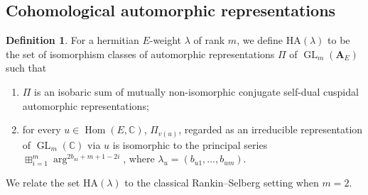 \documentclass[12pt]{amsart}
\numberwithin{equation}{section}
\theoremstyle{plain}
\theoremstyle{definition}
\newtheorem{definition}[proposition]{Definition}
\theoremstyle{remark}
\renewcommand{\b}[1]{\mathbf{#1}}
\renewcommand{\d}[1]{\mathbb{#1}}
\renewcommand{\r}[1]{\mathrm{#1}}
\renewcommand{\(}{\left(}
\renewcommand{\)}{\right)}
\newcommand{\bA}{\b A}
\newcommand{\dC}{\d C}
\newcommand{\HA}{\r{HA}}
\DeclareMathOperator{\GL}{GL}
\DeclareMathOperator{\Hom}{Hom}
\begin{document}
\subsection{Cohomological automorphic representations}
\label{ss:cohomological_automorphic}







\begin{definition}\label{de:hermitian_automorphic}
For a hermitian $E$-weight $\lambda$ of rank $m$, we define $\HA(\lambda)$ to be the set of isomorphism classes of automorphic representations $\Pi$ of $\GL_m(\bA_E)$ such that
\begin{enumerate}
  \item $\Pi$ is an isobaric sum of mutually non-isomorphic conjugate self-dual cuspidal automorphic representations;

  \item for every $u\in\Hom(E,\dC)$, $\Pi_{v(u)}$, regarded as an irreducible representation of $\GL_m(\dC)$ via $u$ is isomorphic to the principal series $\boxplus_{i=1}^m\arg^{2b_{ui}+m+1-2i}$, where $\lambda_u=(b_{u1},\dots,b_{um})$.
\end{enumerate}
\end{definition}


We relate the set $\HA(\lambda)$ to the classical Rankin--Selberg setting when $m=2$.
\end{document}
